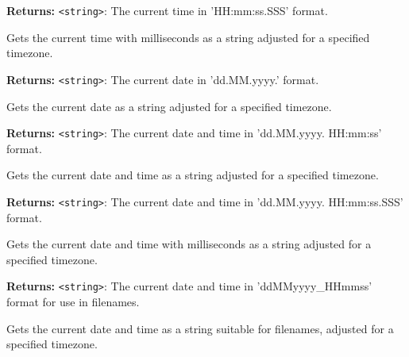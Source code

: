 \documentclass[12pt,a4paper]{article}
\begin{document}
\noindent \textbf{Returns:} \texttt{<string>}: The current time in 'HH:mm:ss.SSS' format.

\noindent Gets the current time with milliseconds as a string adjusted for a specified timezone.

\vspace{5mm}
\noindent {}


\noindent \textbf{Returns:} \texttt{<string>}: The current date in 'dd.MM.yyyy.' format.

\noindent Gets the current date as a string adjusted for a specified timezone.

\vspace{5mm}
\noindent {}


\noindent \textbf{Returns:} \texttt{<string>}: The current date and time in 'dd.MM.yyyy. HH:mm:ss' format.

\noindent Gets the current date and time as a string adjusted for a specified timezone.

\vspace{5mm}
\noindent {}


\noindent \textbf{Returns:} \texttt{<string>}: The current date and time in 'dd.MM.yyyy. HH:mm:ss.SSS' format.

\noindent Gets the current date and time with milliseconds as a string adjusted for a specified timezone.

\vspace{5mm}
\noindent {}


\noindent \textbf{Returns:} \texttt{<string>}: The current date and time in 'ddMMyyyy\_HHmmss' format for use in filenames.

\noindent Gets the current date and time as a string suitable for filenames, adjusted for a specified timezone.

\vspace{5mm}
\noindent {}
\end{document}

